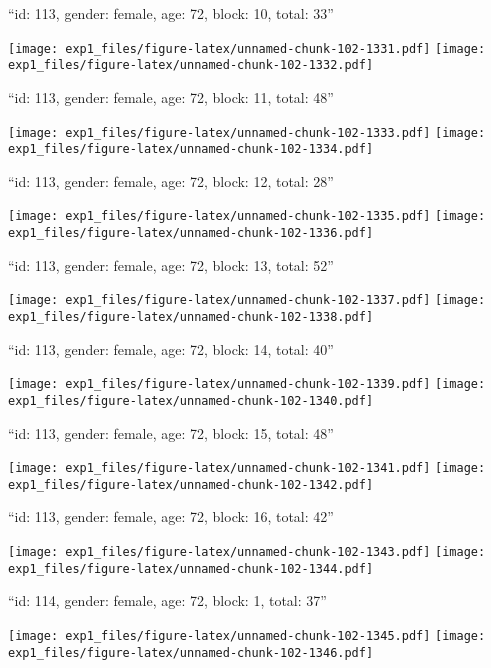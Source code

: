 \documentclass[11pt,,]{article}
\begin{document}
\newpage
[1] 

``id: 113, gender: female, age: 72, block: 10, total: 33''

\texttt{[image: exp1\_files/figure-latex/unnamed-chunk-102-1331.pdf]}
\texttt{[image: exp1\_files/figure-latex/unnamed-chunk-102-1332.pdf]}

\newpage
[1] 

``id: 113, gender: female, age: 72, block: 11, total: 48''

\texttt{[image: exp1\_files/figure-latex/unnamed-chunk-102-1333.pdf]}
\texttt{[image: exp1\_files/figure-latex/unnamed-chunk-102-1334.pdf]}

\newpage
[1] 

``id: 113, gender: female, age: 72, block: 12, total: 28''

\texttt{[image: exp1\_files/figure-latex/unnamed-chunk-102-1335.pdf]}
\texttt{[image: exp1\_files/figure-latex/unnamed-chunk-102-1336.pdf]}

\newpage
[1] 

``id: 113, gender: female, age: 72, block: 13, total: 52''

\texttt{[image: exp1\_files/figure-latex/unnamed-chunk-102-1337.pdf]}
\texttt{[image: exp1\_files/figure-latex/unnamed-chunk-102-1338.pdf]}

\newpage
[1] 

``id: 113, gender: female, age: 72, block: 14, total: 40''

\texttt{[image: exp1\_files/figure-latex/unnamed-chunk-102-1339.pdf]}
\texttt{[image: exp1\_files/figure-latex/unnamed-chunk-102-1340.pdf]}

\newpage
[1] 

``id: 113, gender: female, age: 72, block: 15, total: 48''

\texttt{[image: exp1\_files/figure-latex/unnamed-chunk-102-1341.pdf]}
\texttt{[image: exp1\_files/figure-latex/unnamed-chunk-102-1342.pdf]}

\newpage
[1] 

``id: 113, gender: female, age: 72, block: 16, total: 42''

\texttt{[image: exp1\_files/figure-latex/unnamed-chunk-102-1343.pdf]}
\texttt{[image: exp1\_files/figure-latex/unnamed-chunk-102-1344.pdf]}

\newpage
[1] 

``id: 114, gender: female, age: 72, block: 1, total: 37''

\texttt{[image: exp1\_files/figure-latex/unnamed-chunk-102-1345.pdf]}
\texttt{[image: exp1\_files/figure-latex/unnamed-chunk-102-1346.pdf]}
\end{document}
